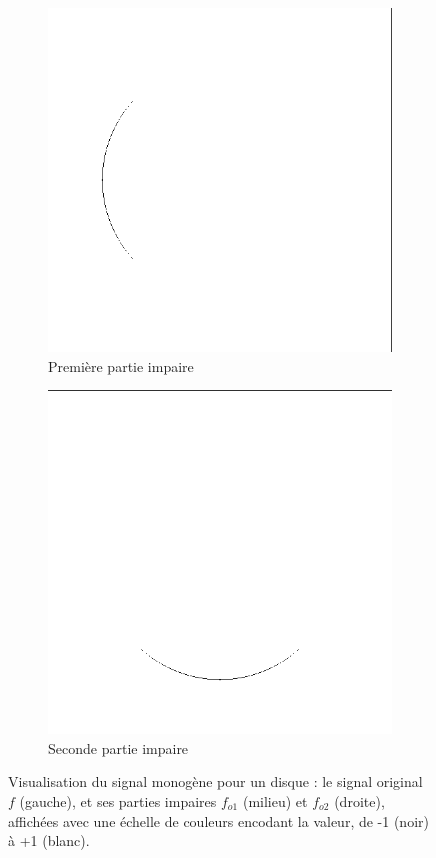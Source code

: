 \begin{figure}
\begin{subfigure}[b]{.3\textwidth}
        \includegraphics[width=\textwidth]{contenu/resources/images/r2_disk}
        \caption{Première partie impaire}
    \end{subfigure}
    \hfill
    \begin{subfigure}[b]{.3\textwidth}
        \includegraphics[width=\textwidth]{contenu/resources/images/r1_disk}
        \caption{Seconde partie impaire}
    \end{subfigure}
    \caption[Visualisation du signal monogène pour un disque]{Visualisation du signal monogène pour un disque : le signal original $f$ (gauche), et ses parties impaires $f_{o1}$ (milieu) et  $f_{o2}$ (droite), affichées avec une échelle de couleurs encodant la valeur, de -1 (noir) à +1 (blanc).}
    \label{fig:monogenic-signal-disk}
\end{figure}

